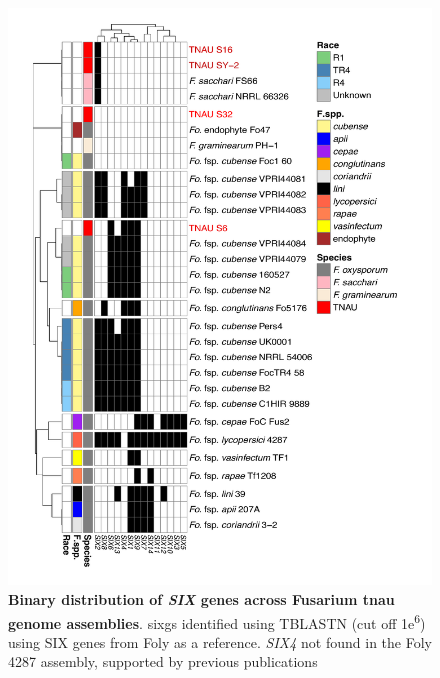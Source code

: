 \begin{figure}[htp!]
  \centering
  \includegraphics[width=15cm]{Figures/SIX_Heatmap.pdf}
  \caption[Binary distribution of \textit{SIX} genes across Fusarium tnau genome assemblies]{\textbf{Binary distribution of \textit{SIX} genes across Fusarium tnau genome assemblies}. \aclp{sixg} identified using TBLASTN (cut off 1\-e\textsuperscript{6}) using SIX genes from \acl{Foly} as a reference. \textit{SIX4} not found in the \acl{Foly} 4287 assembly, supported by previous publications \parencite{Czislowski2018}}
  \label{fig:SixTNAU}
\end{figure}

